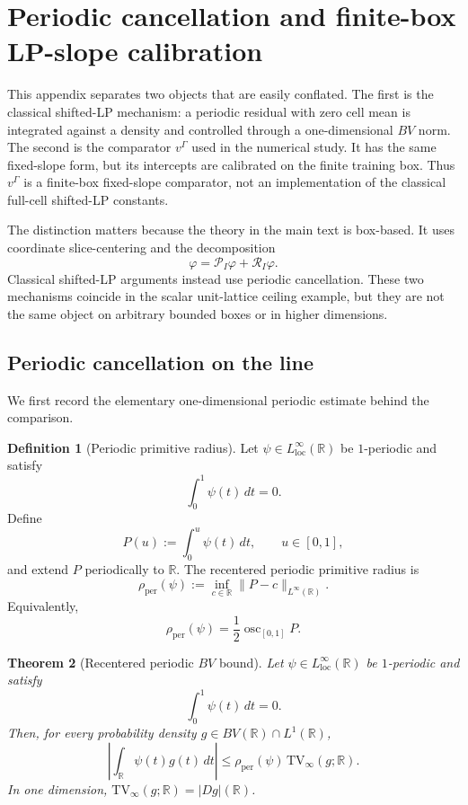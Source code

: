 \documentclass[11pt,letterpaper]{article}
\newtheorem{theorem}{Theorem}[section]
\theoremstyle{definition}
\newtheorem{definition}[theorem]{Definition}
\theoremstyle{remark}
\newcommand{\TV}{\mathrm{TV}}
\begin{document}
 
\section{Periodic cancellation and finite-box LP-slope calibration}
\label{app:periodic_finite_box_shifted_lp}


This appendix separates two objects that are easily conflated. The first is
the classical shifted-LP mechanism: a periodic residual with zero cell mean is
integrated against a density and controlled through a one-dimensional $BV$
norm. The second is the comparator $v^\Gamma$ used in the numerical study. It
has the same fixed-slope form, but its intercepts are calibrated on the finite
training box. Thus $v^\Gamma$ is a finite-box fixed-slope comparator, not an
implementation of the classical full-cell shifted-LP constants.

The distinction matters because the theory in the main text is box-based. It
uses coordinate slice-centering and the decomposition
$$
\varphi=\mathcal P_I\varphi+\mathcal R_I\varphi.
$$
Classical shifted-LP arguments instead use periodic cancellation. These two
mechanisms coincide in the scalar unit-lattice ceiling example, but they are
not the same object on arbitrary bounded boxes or in higher dimensions.

  
\subsection{Periodic cancellation on the line } 
\label{subsec:periodic_comparison_appendix}
  

We first record the elementary one-dimensional periodic estimate behind the
comparison.

\begin{definition}[Periodic primitive radius]
\label{def:periodic_primitive_radius_appendix}
Let $\psi\in L^\infty_{\mathrm{loc}}(\mathbb R)$ be $1$-periodic and satisfy
$$
\int_0^1\psi(t)\,dt=0.
$$
Define
$$
P(u):=\int_0^u\psi(t)\,dt,
\qquad u\in[0,1],
$$
and extend $P$ periodically to $\mathbb R$. The recentered periodic primitive
radius is
$$
\rho_{\mathrm{per}}(\psi)
:=
\inf_{c\in\mathbb R}\|P-c\|_{L^\infty(\mathbb R)}.
$$
Equivalently,
$$
\rho_{\mathrm{per}}(\psi)
=
\frac12\operatorname{osc}_{[0,1]}P.
$$
\end{definition}

\begin{theorem}[Recentered periodic $BV$ bound]
\label{thm:periodic_TV_bound_appendix}
Let $\psi\in L^\infty_{\mathrm{loc}}(\mathbb R)$ be $1$-periodic and satisfy
$$
\int_0^1\psi(t)\,dt=0.
$$
Then, for every probability density $g\in BV(\mathbb R)\cap L^1(\mathbb R)$,
\begin{equation}
\label{eq:periodic_TV_bound_appendix}
\left|
\int_{\mathbb R}\psi(t)g(t)\,dt
\right|
\le
\rho_{\mathrm{per}}(\psi)\,\TV_\infty(g;\mathbb R).
\end{equation}
In one dimension, $\TV_\infty(g;\mathbb R)=|Dg|(\mathbb R)$.
\end{theorem}
\end{document}
